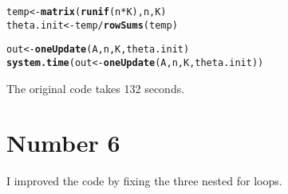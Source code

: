 \documentclass[english]{article}\usepackage[]{graphicx}\usepackage[]{color}
\makeatletter
\newcommand{\hlopt}[1]{\textcolor[rgb]{0,0,0}{#1}}%
\newcommand{\hlstd}[1]{\textcolor[rgb]{0.345,0.345,0.345}{#1}}%
\newcommand{\hlkwb}[1]{\textcolor[rgb]{0.69,0.353,0.396}{#1}}%
\newcommand{\hlkwd}[1]{\textcolor[rgb]{0.737,0.353,0.396}{\textbf{#1}}}%
\newenvironment{kframe}{%
 \def\at@end@of@kframe{}%
 \ifinner\ifhmode%
  \def\at@end@of@kframe{\end{minipage}}%
  \begin{minipage}{\columnwidth}%
 \fi\fi%
 \def\FrameCommand##1{\hskip\@totalleftmargin \hskip-\fboxsep
 \colorbox{shadecolor}{##1}\hskip-\fboxsep
     \hskip-\linewidth \hskip-\@totalleftmargin \hskip\columnwidth}%
 \MakeFramed {\advance\hsize-\width
   \@totalleftmargin\z@ \linewidth\hsize
   \@setminipage}}%
 {\par\unskip\endMakeFramed%
 \at@end@of@kframe}
\newenvironment{knitrout}{}{} %
\makeatother
\begin{document}
\begin{knitrout}
\begin{kframe}
\begin{alltt}
\hlstd{temp} \hlkwb{<-} \hlkwd{matrix}\hlstd{(}\hlkwd{runif}\hlstd{(n}\hlopt{*}\hlstd{K), n, K)}
\hlstd{theta.init} \hlkwb{<-} \hlstd{temp}\hlopt{/}\hlkwd{rowSums}\hlstd{(temp)}

\hlstd{out} \hlkwb{<-} \hlkwd{oneUpdate}\hlstd{(A, n, K, theta.init)}
\hlkwd{system.time}\hlstd{(out} \hlkwb{<-} \hlkwd{oneUpdate}\hlstd{(A, n, K, theta.init))}
\end{alltt}
\end{kframe}
\end{knitrout}

The original code takes 132 seconds.


\section*{Number 6}

I improved the code by fixing the three nested for loops.
\end{document}

